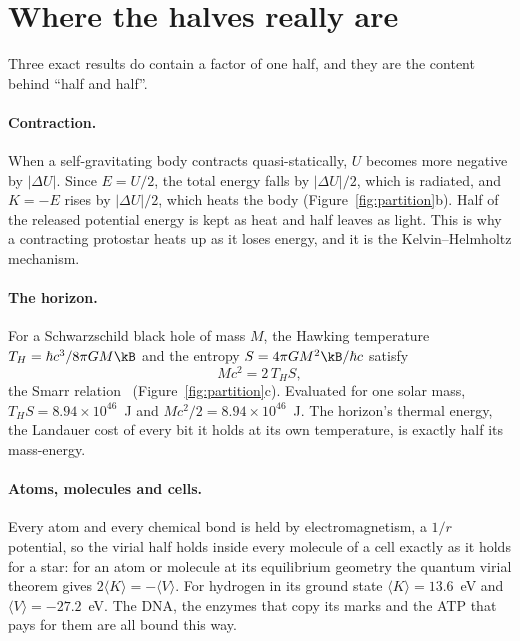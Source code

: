 \section{Where the halves really are}

Three exact results do contain a factor of one half, and they are the content behind ``half and
half''.

\paragraph{Contraction.} When a self-gravitating body contracts quasi-statically, $U$ becomes more
negative by $|\Delta U|$. Since $E=U/2$, the total energy falls by $|\Delta U|/2$, which is radiated,
and $K=-E$ rises by $|\Delta U|/2$, which heats the body (Figure~\ref{fig:partition}b). Half of the
released potential energy is kept as heat and half leaves as light. This is why a contracting
protostar heats up as it loses energy, and it is the Kelvin--Helmholtz mechanism. \derived

\paragraph{The horizon.} For a Schwarzschild black hole of mass $M$, the Hawking temperature
$T_H=\hbar c^3/8\pi GM\kB$ and the entropy $S=4\pi GM^2\kB/\hbar c$ satisfy
\begin{equation}
  Mc^2=2\,T_HS ,
  \label{eq:smarr}
\end{equation}
the Smarr relation~\cite{Smarr1973} (Figure~\ref{fig:partition}c). Evaluated for one solar mass,
$T_HS=8.94\times10^{46}$~J and $Mc^2/2=8.94\times10^{46}$~J. \calc{} The horizon's thermal energy,
the Landauer cost of every bit it holds at its own temperature, is exactly half its mass-energy.

\paragraph{Atoms, molecules and cells.} Every atom and every chemical bond is held by electromagnetism, a $1/r$ potential, so the
virial half holds inside every molecule of a cell exactly as it holds for a star: for an atom or molecule at its equilibrium
geometry the quantum virial theorem gives $2\langle K\rangle=-\langle V\rangle$. For hydrogen in its ground state $\langle K\rangle=13.6$~eV and
$\langle V\rangle=-27.2$~eV. \derived{} The DNA, the enzymes that copy its marks and the ATP that pays for them are all
bound this way.

